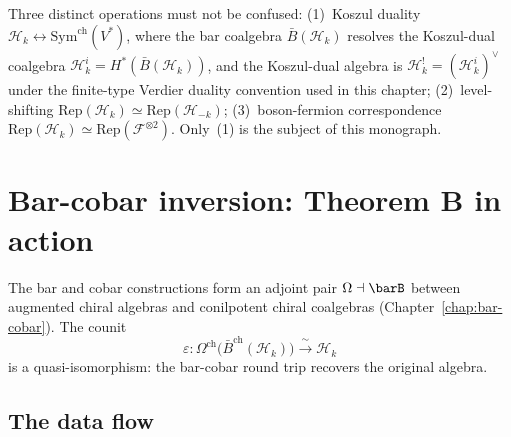 \begin{remark}
\label{rem:frame-three-dualities}
Three distinct operations must not be confused:
(1)~Koszul duality
$\mathcal{H}_k \leftrightarrow \mathrm{Sym}^{\mathrm{ch}}(V^*)$,
where the bar coalgebra $\bar{B}(\mathcal{H}_k)$ resolves the
Koszul-dual coalgebra
$\mathcal{H}_k^i=H^*(\bar{B}(\mathcal{H}_k))$, and the
Koszul-dual algebra is
$\mathcal{H}_k^!=(\mathcal{H}_k^i)^\vee$ under the finite-type
Verdier duality convention used in this chapter;
(2)~level-shifting
$\mathrm{Rep}(\mathcal{H}_k) \simeq \mathrm{Rep}(\mathcal{H}_{-k})$;
(3)~boson-fermion correspondence
$\mathrm{Rep}(\mathcal{H}_k) \simeq
\mathrm{Rep}(\mathcal{F}^{\otimes 2})$.
Only~(1) is the subject of this monograph.
\end{remark}

\section{Bar-cobar inversion: Theorem B in action}
\label{sec:frame-inversion}

The bar and cobar constructions form an adjoint pair
$\Omega \dashv \barB$ between augmented chiral algebras and
conilpotent chiral coalgebras (Chapter~\ref{chap:bar-cobar}).
The counit
\begin{equation}\label{eq:frame-bar-cobar-inversion}
\varepsilon\colon
\Omega^{\mathrm{ch}}\bigl(\bar{B}^{\mathrm{ch}}(\mathcal{H}_k)\bigr)
\xrightarrow{\;\sim\;} \mathcal{H}_k
\end{equation}
is a quasi-isomorphism: the bar-cobar round trip recovers the
original algebra.

\subsection{The data flow}

